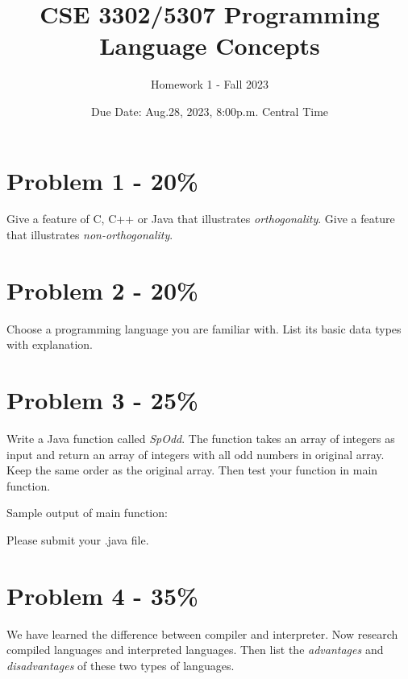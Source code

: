 \documentclass{article}
\begin{document}
\title{CSE 3302/5307 Programming Language Concepts}
\author{Homework 1 - Fall 2023}
\date{Due Date: Aug.28, 2023, 8:00p.m. Central Time}
\maketitle
\thispagestyle{fancy}
\section*{Problem 1 - 20\%}
{ Give a feature of C, C++ or Java that illustrates \textit{orthogonality}. Give a feature that illustrates \textit{non-orthogonality}.}

\section*{Problem 2 - 20\%}
{ Choose a programming language you are familiar with. List its basic data types with explanation.}

\section*{Problem 3 - 25\%}
Write a Java function called \textit{SpOdd}. The function takes an array of integers as input and return an array of integers with all odd numbers in original array. Keep the same order as the original array. Then test your function in main function.
	
Sample output of main function:

Please submit your .java file.

\section*{Problem 4 - 35\%}
{ We have learned the difference between compiler and interpreter. Now research compiled languages and interpreted languages. Then list the \textit{advantages} and \textit{disadvantages} of these two types of languages.}
\end{document}

